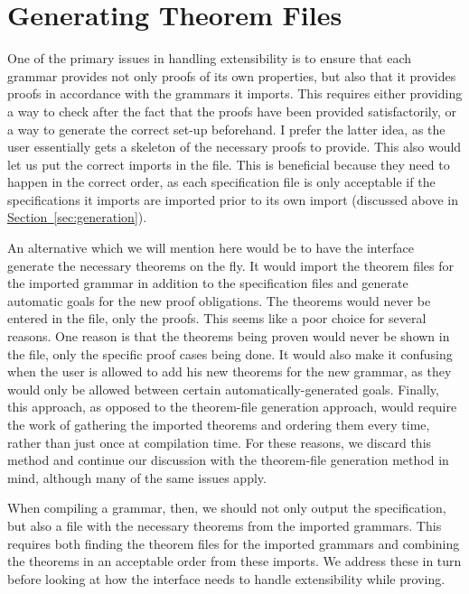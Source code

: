 \documentclass[11pt]{article}
\renewcommand{\sec}[1]{\hyperref[sec:#1]{Section~\ref*{sec:#1}}}
\begin{document}
\section{Generating Theorem Files}

One of the primary issues in handling extensibility is to ensure that
each grammar provides not only proofs of its own properties, but also
that it provides proofs in accordance with the grammars it imports.
This requires either providing a way to check after the fact that the
proofs have been provided satisfactorily, or a way to generate the
correct set-up beforehand.  I prefer the latter idea, as the user
essentially gets a skeleton of the necessary proofs to provide.  This
also would let us put the correct imports in the file.  This is
beneficial because they need to happen in the correct order, as each
specification file is only acceptable if the specifications it imports
are imported prior to its own import (discussed above in
\sec{generation}).


An alternative which we will mention here would be to have the
interface generate the necessary theorems on the fly.  It would import
the theorem files for the imported grammar in addition to the
specification files and generate automatic goals for the new proof
obligations.  The theorems would never be entered in the file, only
the proofs.
%
This seems like a poor choice for several reasons.  One reason is that
the theorems being proven would never be shown in the file, only the
specific proof cases being done.  It would also make it confusing when
the user is allowed to add his new theorems for the new grammar, as
they would only be allowed between certain automatically-generated
goals.  Finally, this approach, as opposed to the theorem-file
generation approach, would require the work of gathering the imported
theorems and ordering them every time, rather than just once at
compilation time.
%
For these reasons, we discard this method and continue our discussion
with the theorem-file generation method in mind, although many of the
same issues apply.


When compiling a grammar, then, we should not only output the
specification, but also a file with the necessary theorems from the
imported grammars.  This requires both finding the theorem files for
the imported grammars and combining the theorems in an acceptable
order from these imports.  We address these in turn before looking at
how the interface needs to handle extensibility while proving.
\end{document}
